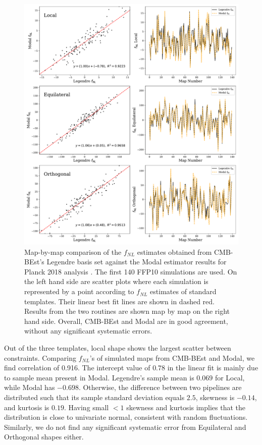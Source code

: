 \begin{figure}[htbp!] 
	\centering    
	\includegraphics[width=\textwidth]{map_by_map_Legendre_Modal.pdf}
	\caption{Map-by-map comparison of the $f_{NL}$ estimates obtained from CMB-BEst's Legendre basis set against the Modal estimator results for Planck 2018 analysis \cite{PlanckCollaboration2018}. The first 140 FFP10 simulations are used. On the left hand side are scatter plots where each simulation is represented by a point according to $f_{NL}$ estimates of standard templates. Their linear best fit lines are shown in dashed red. Results from the two routines are shown map by map on the right hand side. Overall, CMB-BEst and Modal are in good agreement, without any significant systematic errors.}
	\label{fig:map_by_map_Legendre_Modal}
\end{figure}

Out of the three templates, local shape shows the largest scatter between constraints. Comparing $f_{NL}$'s of simulated maps from CMB-BEst and Modal, we find correlation of 0.916. The intercept value of $0.78$ in the linear fit is mainly due to sample mean present in Modal. Legendre's sample mean is $0.069$ for Local, while Modal has $-0.698$. Otherwise, the difference between two pipelines are distributed such that its sample standard deviation equals $2.5$, skewness is $-0.14$, and kurtosis is $0.19$. Having small $<1$ skewness and kurtosis implies that the distribution is close to univariate normal, consistent with random fluctuations. Similarly, we do not find any significant systematic error from Equilateral and Orthogonal shapes either.

